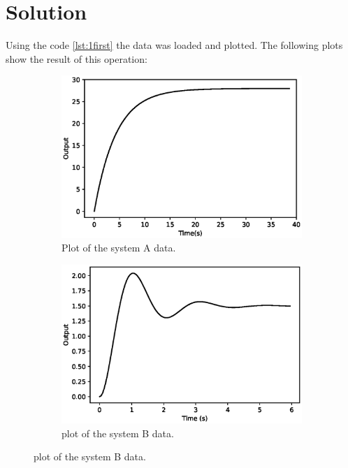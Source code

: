 \documentclass[a4paper]{article}
\begin{document}
\section*{Solution}

Using the code \ref{lst:1first} the data was loaded and plotted. The following plots show the result of this operation:
\begin{figure}[H]
\begin{subfigure}{.5\textwidth}
  \centering
  \includegraphics[width=.8\linewidth]{Figures/Question1/EXE_1_SYS_A.eps}  
  \caption{Plot of the system A data.} 
  \label{fig:SYS_A_data}
\end{subfigure}
\begin{subfigure}{.5\textwidth}
  \centering
  \includegraphics[width=.8\linewidth]{Figures/Question1/EXE_1_SYS_B.eps} 
\caption{plot of the system B data.}  
	\label{fig:SYS_B_data}
\end{subfigure}
\end{figure}

\end{document}
